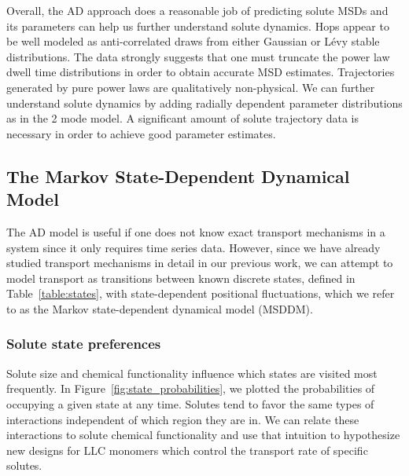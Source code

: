 \documentclass[aps,pre,preprint,groupedaddress,longbibliography]{revtex4-2}
\begin{document}

  Overall, the AD approach does a reasonable job of predicting solute MSDs and
  its parameters can help us further understand solute dynamics. Hops appear to
  be well modeled as anti-correlated draws from either Gaussian or L\'evy
  stable distributions. The data strongly suggests that one must truncate the
  power law dwell time distributions in order to obtain accurate MSD estimates.
  Trajectories generated by pure power laws are qualitatively non-physical. We
  can further understand solute dynamics by adding radially dependent parameter
  distributions as in the 2 mode model. A significant amount of solute
  trajectory data is necessary in order to achieve good parameter estimates. 

  \subsection{The Markov State-Dependent Dynamical Model}\label{section:msm_results}
  
  The AD model is useful if one does not know exact transport mechanisms 
  in a system since it only requires time series data. However, since we have
  already studied transport mechanisms in detail in our previous work, we can
  attempt to model transport as transitions between known discrete
  states, defined in Table~\ref{table:states}, with state-dependent positional
  fluctuations, which we refer to as the Markov state-dependent dynamical model (MSDDM).

  \subsubsection{Solute state preferences}\label{section:state_preferences}

  Solute size and chemical functionality influence which states are visited
  most frequently.  In Figure~\ref{fig:state_probabilities}, we plotted the
  probabilities of occupying a given state at any time. Solutes tend to favor
  the same types of interactions independent of which region they are in.  We
  can relate these interactions to solute chemical functionality and use that
  intuition to hypothesize new designs for LLC monomers which control the
  transport rate of specific solutes.
  
\end{document}
